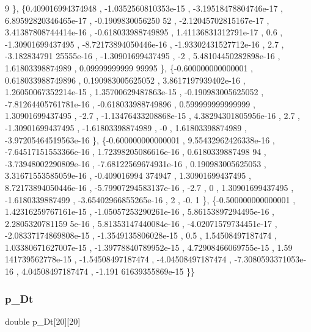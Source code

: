 \begin{DoxyCode}
      9 \},
\{0.409016994374948 , -1.0352560810353e-15 , -3.19518478804746e-17 , 6.89592820346465e-17 , -0.1909830056250
      52 , -2.12045702815167e-17 , 3.41387808744414e-16 , -0.618033988749895 , 1.41136831312791e-17 ,             
        0.6 , -1.30901699437495 , -8.72173894050446e-16 , -1.93302431527712e-16 ,               2.7 , -3.182834791
      25555e-16 , -1.30901699437495 ,                -2 , 5.48104450282898e-16 ,  1.61803398874989 , 0.09999999999
      99995 \},
\{-0.600000000000001 , 0.618033988749896 , 0.190983005625052 , 3.8617197939402e-16 , 1.26050067352214e-15 , 
      1.35700629487863e-15 , -0.190983005625052 , -7.81264405761781e-16 , -0.618033988749896 , 0.599999999999999 ,
        1.30901699437495 ,              -2.7 , -1.13476433208868e-15 , 4.38294301805956e-16 ,               2.7 , 
      -1.30901699437495 , -1.61803398874989 ,                -0 ,  1.61803398874989 , -3.97205464519563e-16 \},
\{-0.600000000000001 , 9.55432962426338e-16 , -7.64517151553366e-16 , 1.72398205086616e-16 , 0.6180339887498
      94 , -3.73948002290809e-16 , -7.68122569674931e-16 , 0.190983005625053 , 3.31671553585059e-16 , -0.409016994
      374947 ,  1.30901699437495 , 8.72173894050446e-16 , -5.79907294583137e-16 ,              -2.7 ,             
          0 ,  1.30901699437495 ,  -1.6180339887499 , -3.65402966855265e-16 ,                 2 ,              -0.
      1 \},
\{-0.500000000000001 , 1.42316259767161e-15 , -1.05057253290261e-16 , 5.86153897294495e-16 , 2.2805320781159
      5e-16 , 5.81353147440084e-16 , -4.02071579734451e-17 , -2.08337174869808e-15 , -1.3549135806028e-15 ,       
              0.5 ,  1.54508497187474 , 1.03380671627007e-15 , -1.39778840789952e-15 , 4.72908466069755e-15 , 1.59
      141739562778e-15 , -1.54508497187474 , -4.04508497187474 , -7.3080593371053e-16 ,  4.04508497187474 , -1.191
      61639355869e-15 \}\}
\end{DoxyCode}
\mbox{\label{a00485_a2195a031817533392de73a55c8509899}} 
\subsubsection{\texorpdfstring{p\+\_\+\+Dt}{p\_Dt}}
{\footnotesize\ttfamily double p\+\_\+\+Dt\mbox{[}20\mbox{]}\mbox{[}20\mbox{]}}

